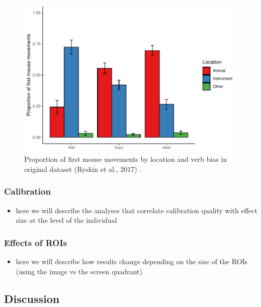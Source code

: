 \documentclass[
  english,
  man,floatsintext]{apa6}
\providecommand{\tightlist}{%
  \setlength{\itemsep}{0pt}\setlength{\parskip}{0pt}}
\begin{document}
\begin{figure}
\centering
\includegraphics{manuscript_files/figure-latex/E4-mouse-moves-fig-web-and-orig-1.pdf}
\caption{\label{fig:E4-mouse-moves-fig-web-and-orig}Proportion of first mouse movements by location and verb bias in original dataset (Ryskin et al., 2017) .}
\end{figure}

\hypertarget{calibration-2}{%
\subsubsection{Calibration}\label{calibration-2}}

\begin{itemize}
\tightlist
\item
  here we will describe the analyses that correlate calibration quality with effect size at the level of the individual
\end{itemize}

\hypertarget{effects-of-rois}{%
\subsubsection{Effects of ROIs}\label{effects-of-rois}}

\begin{itemize}
\tightlist
\item
  here we will describe how results change depending on the size of the ROIs (using the image vs the screen quadrant)
\end{itemize}

\hypertarget{discussion-3}{%
\subsection{Discussion}\label{discussion-3}}
\end{document}

